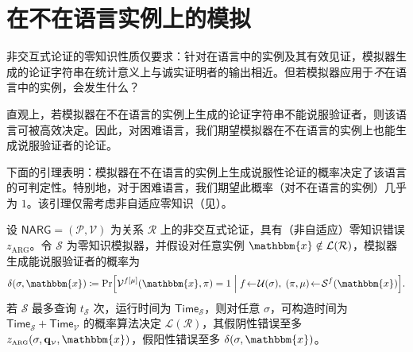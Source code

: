 \documentclass[american,singlepageview]{snargs-book-zh}
\newcommand{\DefineEqual}{\coloneqq}
\newcommand{\Relation}{\mathcal{R}}
\newcommand{\Language}{\mathcal{L}}
\newcommand{\GetLanguage}[1]{\Language(#1)}
\newcommand{\Instance}{\mathbbm{x}}
\newcommand{\ProtoProver}{P}
\newcommand{\ProtoVerifier}{V}
\newcommand{\ProtoSimulator}{S}
\newcommand{\ProtoZKError}{z}
\newcommand{\ProtoTime}{\mathsf{Time}}
\newcommand{\NARGSymbol}{\mathsf{NARG}}
\newcommand{\ARGSubscript}{\scriptscriptstyle\mathrm{ARG}}
\newcommand{\ARGFormat}[1]{\mathcal{#1}}
\newcommand{\ARGProver}{\ARGFormat{\ProtoProver}}
\newcommand{\ARGVerifier}{\ARGFormat{\ProtoVerifier}}
\newcommand{\ARGSystem}{(\ARGProver,\ARGVerifier)}
\newcommand{\ARGSimulator}{\ARGFormat{\ProtoSimulator}}
\newcommand{\ARGString}{\pi}
\newcommand{\ARGZKError}{\ProtoZKError_{\ARGSubscript}}
\newcommand{\ARGZKProgrammedList}{\ProgrammedList}
\newcommand{\ARGComplexityFormat}[1]{\mathbf{#1}}
\newcommand{\ARGQueryV}{\ARGComplexityFormat{q}_{\scriptscriptstyle\ARGVerifier}}
\newcommand{\ROFunction}{f}
\newcommand{\ROQueryBound}{t}
\newcommand{\RODistribution}[1]{\mathcal{U}(#1)}
\newcommand{\ROOutputSize}{\sigma}
\newcommand{\ROProgram}[2]{#1[#2]}
\newcommand{\ProgrammedList}{\mu}
\begin{document}
\section{在不在语言实例上的模拟}
\label{section:simulators-not-in-language}

非交互式论证的零知识性质仅要求：针对在语言中的实例及其有效见证，模拟器生成的论证字符串在统计意义上与诚实证明者的输出相近。但若模拟器应用于\emph{不}在语言中的实例，会发生什么？

直观上，若模拟器在不在语言的实例上生成的论证字符串不能说服验证者，则该语言可被高效决定。因此，对困难语言，我们期望模拟器在不在语言的实例上也能生成说服验证者的论证。

下面的引理表明：模拟器在不在语言的实例上生成说服性论证的概率决定了该语言的可判定性。特别地，对于困难语言，我们期望此概率（对不在语言的实例）几乎为 $1$。该引理仅需考虑非自适应零知识（见）。

\begin{lemma}
\label{lemma:simulators-not-in-language}
设 $\NARGSymbol=\ARGSystem$ 为关系 $\Relation$ 上的非交互式论证，具有（非自适应）零知识错误 $\ARGZKError$。令 $\ARGSimulator$ 为零知识模拟器，并假设对任意实例 $\Instance\notin\GetLanguage{\Relation}$，模拟器生成能说服验证者的概率为
\[
  \delta(\ROOutputSize,\Instance)
  \DefineEqual
  \Pr\Bigl[
    \ARGVerifier^{\ROProgram{\ROFunction}{\ARGZKProgrammedList}}(\Instance,\ARGString)=1
    \;\Big|\;
    \ROFunction\!\gets\!\RODistribution{\ROOutputSize},\;
    (\ARGString,\ARGZKProgrammedList)\!\gets\!\ARGSimulator^{\ROFunction}(\Instance)
  \Bigr].
\]
若 $\ARGSimulator$ 最多查询 $\ROQueryBound_{\ARGSimulator}$ 次，运行时间为 $\ProtoTime_{\ARGSimulator}$，则对任意 $\ROOutputSize$，可构造时间为 $\ProtoTime_{\ARGSimulator}+\ProtoTime_{\ARGVerifier}$ 的概率算法决定 $\GetLanguage{\Relation}$，其假阴性错误至多 $\ARGZKError(\ROOutputSize,\ARGQueryV,\Instance)$，假阳性错误至多 $\delta(\ROOutputSize,\Instance)$。
\end{lemma}
\end{document}
